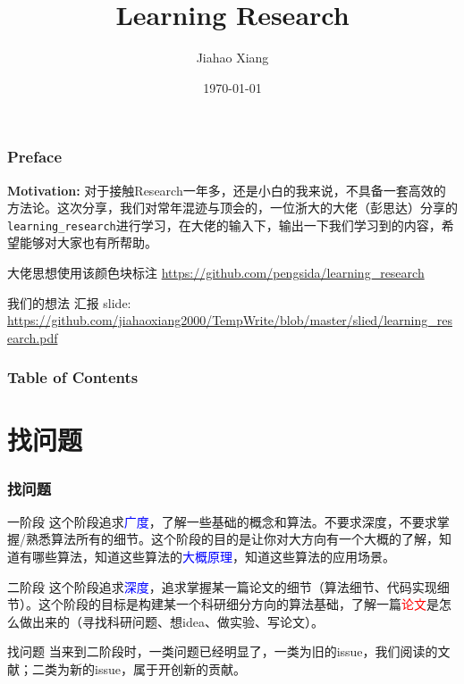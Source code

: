 \documentclass{beamer}
\title{\textbf{Learning Research}}
\author[xjh]{Jiahao Xiang\inst{1}}
\institute{
    \inst{1}
    Hengyang Normal University
}
\date{\today}
\begin{document}
\begin{frame}
    \titlepage
\end{frame}

\begin{frame}
    \frametitle{Preface}
    \textbf{Motivation:} 对于接触Research一年多，还是小白的我来说，不具备一套高效的方法论。这次分享，我们对常年混迹与顶会的，一位浙大的大佬（彭思达）分享的\texttt{learning\_research}进行学习，在大佬的输入下，输出一下我们学习到的内容，希望能够对大家也有所帮助。
    \vfill
    \begin{block}{大佬思想使用该颜色块标注}
        \url{https://github.com/pengsida/learning_research}
    \end{block}
    \begin{exampleblock}{我们的想法}
        汇报 slide: \url{https://github.com/jiahaoxiang2000/TempWrite/blob/master/slied/learning_research.pdf}
    \end{exampleblock}
    
    
\end{frame}

\begin{frame}
    \frametitle{Table of Contents}
    \tableofcontents
\end{frame}

\section{找问题}
\begin{frame}
    \frametitle{找问题}
    \begin{block}{一阶段}
        这个阶段追求\textcolor{blue}{广度}，了解一些基础的概念和算法。不要求深度，不要求掌握/熟悉算法所有的细节。这个阶段的目的是让你对大方向有一个大概的了解，知道有哪些算法，知道这些算法的\textcolor{blue}{大概原理}，知道这些算法的应用场景。
    \end{block}
    \begin{block}{二阶段}
        这个阶段追求\textcolor{blue}{深度}，追求掌握某一篇论文的细节（算法细节、代码实现细节）。这个阶段的目标是构建某一个科研细分方向的算法基础，了解一篇\textcolor{red}{论文}是怎么做出来的（寻找科研问题、想idea、做实验、写论文）。
    \end{block}
    \begin{exampleblock}{找问题}
        当来到二阶段时，一类问题已经明显了，一类为旧的issue，我们阅读的文献；二类为新的issue，属于开创新的贡献。
    \end{exampleblock}

\end{frame}
\end{document}
